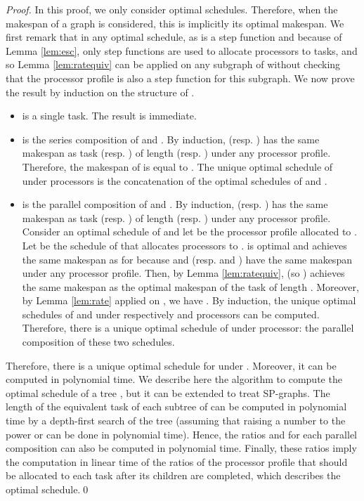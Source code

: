\documentclass{llncs}
\newcommand{\fctofproc}{{processor profile}\xspace}
\begin{document}
\begin{proof}
  In this proof, we only consider optimal schedules. Therefore, when
  the makespan of a graph is considered, this is implicitly its
  optimal makespan.
We first remark that in any optimal schedule, as  is a step
  function and because of Lemma \ref{lem:esc}, only step functions are
  used to allocate processors to tasks, and so Lemma
  \ref{lem:ratequiv} can be applied on any subgraph of  without
  checking that the \fctofproc is also a step function for this
  subgraph.
We now prove the result by induction on the structure of .
  \begin{itemize}
  \item  is a single task. The result is immediate.

  \item  is the series composition of  and . By
    induction,  (resp. ) has the same makespan as task
     (resp. ) of length  (resp. ) under any
    \fctofproc. Therefore, the makespan of  is equal to .
The unique optimal schedule of  under  processors is the
    concatenation of the optimal schedules of  and .


  \item  is the parallel composition of  and . By
    induction,  (resp. ) has the same makespan as task
     (resp. ) of length  (resp. ) under any
    \fctofproc.
Consider an optimal schedule  of  and let  be the
    \fctofproc allocated to . Let  be the schedule of
     that allocates  processors to
    .  is optimal and achieves the same makespan as 
    for  because  and  (resp.  and ) have the
    same makespan under any \fctofproc.  Then, by Lemma
    \ref{lem:ratequiv},  (so ) achieves the same makespan as
    the optimal makespan of the task  of length .
Moreover, by Lemma \ref{lem:rate} applied on ,
    we have . By induction, the unique optimal
    schedules of  and  under respectively  and
     processors can be computed. Therefore, there is a
    unique optimal schedule of  under  processor: the
    parallel composition of these two schedules.  
  \end{itemize}
  
  Therefore, there is a unique optimal schedule for  under . Moreover,
  it can be computed in polynomial time. We describe here the algorithm to
  compute the optimal schedule of a tree , but
  it can be extended to treat SP-graphs. The length of the equivalent
  task of each subtree of  can be computed in polynomial time by a
  depth-first search of the tree (assuming that raising a number to the power
   or  can be done in polynomial time). Hence, the ratios
   and  for each parallel composition can also be computed in
  polynomial time. Finally, these ratios imply the computation in linear time of
  the ratios of the processor profile that should be allocated to each task
  after its children are completed, which describes the optimal schedule.\qed
\end{proof}
\end{document}
